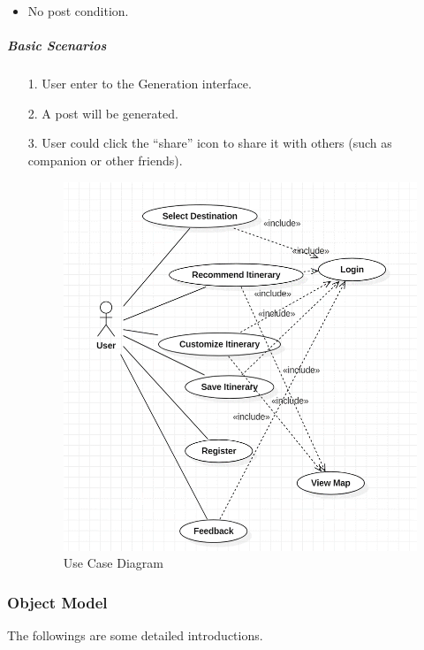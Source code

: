 \documentclass[10pt]{article}
\begin{document}
\begin{itemize}
\begin{itemize}
			 \item No post condition.
		 \end{itemize}

		 \subparagraph{Basic Scenarios}
		 \begin{itemize}
			 \item[1.] User enter to the Generation interface.
			 \item[2.]	A post will be generated.
			 \item[3.] User could click the “share” icon to share it with others (such as companion or other friends).
			 
			 \begin{figure}[H]
				 \centering
				 \includegraphics[width=14cm]{usecase.png} 
				 \caption{Use Case Diagram}
				 \label{Use Case Diagram}
			 \end{figure}
			 
			 
		 \end{itemize}
\end{itemize}

\subsubsection{Object Model}
The followings are some detailed introductions.
\end{document}
